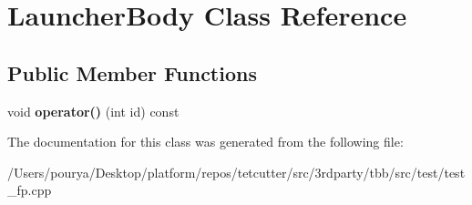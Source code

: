 \hypertarget{classLauncherBody}{}\section{Launcher\+Body Class Reference}
\label{classLauncherBody}
\subsection*{Public Member Functions}
\begin{DoxyCompactItemize}
\item 
\hypertarget{classLauncherBody_ada25aeb3f41e370e4e0ce1d42d42abe2}{}void {\bfseries operator()} (int id) const \label{classLauncherBody_ada25aeb3f41e370e4e0ce1d42d42abe2}

\end{DoxyCompactItemize}


The documentation for this class was generated from the following file\+:\begin{DoxyCompactItemize}
\item 
/\+Users/pourya/\+Desktop/platform/repos/tetcutter/src/3rdparty/tbb/src/test/test\+\_\+fp.\+cpp\end{DoxyCompactItemize}
